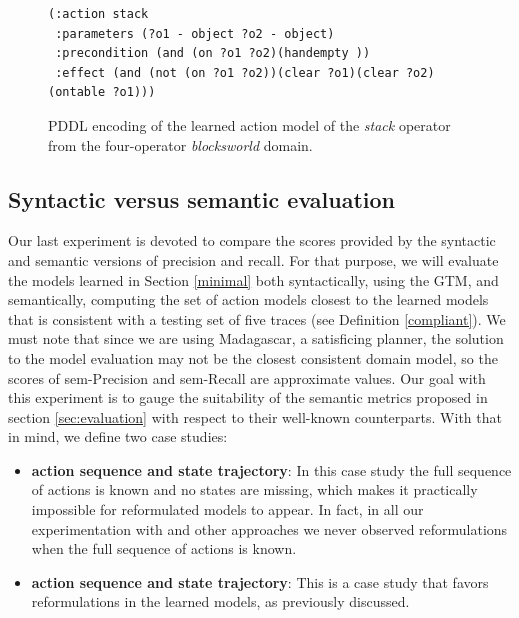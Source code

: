 \begin{figure}[hbt!]
	\begin{footnotesize}
		\begin{verbatim}
(:action stack
 :parameters (?o1 - object ?o2 - object)
 :precondition (and (on ?o1 ?o2)(handempty ))
 :effect (and (not (on ?o1 ?o2))(clear ?o1)(clear ?o2)(ontable ?o1)))
		\end{verbatim}
	\end{footnotesize}
	\caption{PDDL encoding of the learned action model of the {\em stack} operator from the four-operator {\em blocksworld} domain.}
	\label{fig:macroaction}
\end{figure}



\subsection{Syntactic versus semantic evaluation}
\label{semantic}

Our last experiment is devoted to compare the scores provided by the syntactic and semantic versions of precision and recall. For that purpose, we will evaluate the models learned in Section \ref{minimal} both syntactically, using the GTM, and semantically, computing the set of action models closest to the learned models that is consistent with a testing set of five traces (see Definition \ref{compliant}). We must note that since we are using {\sc Madagascar}, a satisficing planner, the solution to the model evaluation may not be the closest consistent domain model, so the scores of sem-Precision and sem-Recall are approximate values. Our goal with this experiment is to gauge the suitability of the semantic metrics proposed in section \ref{sec:evaluation} with respect to their well-known counterparts. With that in mind, we define two case studies:

\begin{itemize}
	\item \textbf{\FO action sequence and \PO state trajectory}: In this case study the full sequence of actions is known and no states are missing, which makes it practically impossible for reformulated models to appear. In fact, in all our experimentation with \FAMA and other approaches we never observed reformulations when the full sequence of actions is known.
	\item  \textbf{\NO action sequence and \NO state trajectory}: This is a case study that favors reformulations in the learned models, as previously discussed.
\end{itemize}

